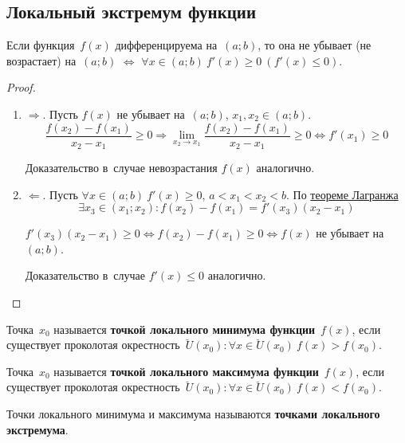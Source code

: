 \subsection{Локальный экстремум функции}
\begin{theorem}
\label{th:criterion_of_monotonic_function}
Если функция~$f(x)$ дифференцируема на~$(a; b)$, то она не убывает (не возрастает) на~$(a; b)$ $\Leftrightarrow$ $\forall x \in (a; b) \ f'(x) \geqslant 0 \ (f'(x) \leqslant 0)$.
\end{theorem}
\begin{proof}
\begin{enumerate}
	\item $\Rightarrow$. Пусть $f(x)$ не убывает на~$(a; b)$, $x_1, x_2 \in (a; b)$.
	\begin{equation*}
	\frac{f(x_2) - f(x_1)}{x_2 - x_1} \geqslant 0 \Rightarrow
	\lim_{x_2 \to x_1} \frac{f(x_2) - f(x_1)}{x_2 - x_1} \geqslant 0 \Leftrightarrow
	f'(x_1) \geqslant 0
	\end{equation*}
	
	Доказательство в~случае невозрастания $f(x)$ аналогично.
	
	\item $\Leftarrow$. Пусть $\forall x \in (a; b) \ f'(x) \geqslant 0$, $a < x_1 < x_2 < b$.
	По \hyperref[th:mean_value]{теореме Лагранжа}
	\begin{equation*}
	\exists x_3 \in (x_1; x_2) \colon f(x_2) - f(x_1) = f'(x_3)(x_2 - x_1)
	\end{equation*}
	
	$f'(x_3)(x_2 - x_1) \geqslant 0 \Leftrightarrow
	f(x_2) - f(x_1) \geqslant 0 \Leftrightarrow
	f(x)$ не убывает на~$(a; b)$.
	
	Доказательство в~случае $f'(x) \leqslant 0$ аналогично.
\end{enumerate}
\end{proof}

 Точка~$x_0$ называется \textbf{точкой локального минимума функции}~$f(x)$, если существует проколотая окрестность~$\breve U(x_0) \colon \forall x \in \breve U(x_0) \ f(x) > f(x_0)$.

 Точка~$x_0$ называется \textbf{точкой локального максимума функции}~$f(x)$, если существует проколотая окрестность~$\breve U(x_0) \colon \forall x \in \breve U(x_0) \ f(x) < f(x_0)$.

 Точки локального минимума и максимума называются \textbf{точками локального экстремума}.

